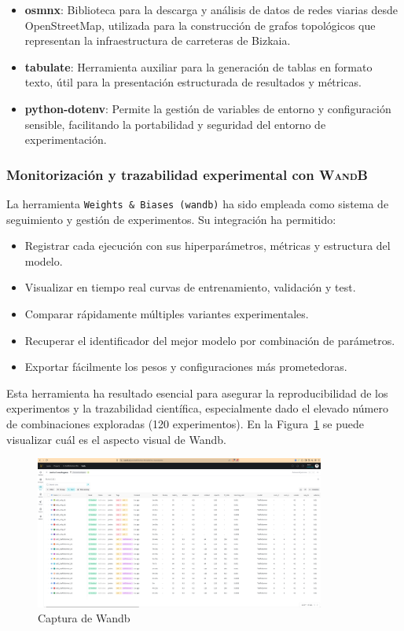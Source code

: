 \begin{itemize}
	\item \textbf{osmnx}: Biblioteca para la descarga y análisis de datos de redes viarias desde OpenStreetMap, utilizada para la construcción de grafos topológicos que representan la infraestructura de carreteras de Bizkaia.
	
	\item \textbf{tabulate}: Herramienta auxiliar para la generación de tablas en formato texto, útil para la presentación estructurada de resultados y métricas.
	
	\item \textbf{python-dotenv}: Permite la gestión de variables de entorno y configuración sensible, facilitando la portabilidad y seguridad del entorno de experimentación.
	
\end{itemize}

\subsubsection*{Monitorización y trazabilidad experimental con W\textsc{and}B}

La herramienta \texttt{Weights \& Biases (wandb)} ha sido empleada como sistema de seguimiento y gestión de experimentos. Su integración ha permitido:

\begin{itemize}
	\item Registrar cada ejecución con sus hiperparámetros, métricas y estructura del modelo.
	\item Visualizar en tiempo real curvas de entrenamiento, validación y test.
	\item Comparar rápidamente múltiples variantes experimentales.
	\item Recuperar el identificador del mejor modelo por combinación de parámetros.
	\item Exportar fácilmente los pesos y configuraciones más prometedoras.
\end{itemize}

Esta herramienta ha resultado esencial para asegurar la reproducibilidad de los experimentos y la trazabilidad científica, especialmente dado el elevado número de combinaciones exploradas (120 experimentos). En la Figura~\ref{fig:capt_wandb} se puede visualizar cuál es el aspecto visual de Wandb.

\begin{figure}[H]
	\centering
	\includegraphics[width=0.85\textwidth]{includes/cap5/captura_wandb.png}
	\caption{Captura de Wandb}
	\label{fig:capt_wandb}
\end{figure}

